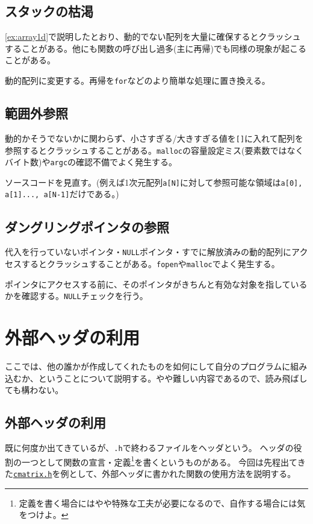 \subsection*{スタックの枯渇}
\ref{ex:array1d}で説明したとおり、動的でない配列を大量に確保するとクラッシュすることがある。他にも関数の呼び出し過多(主に再帰)でも同様の現象が起こることがある。

動的配列に変更する。再帰を\texttt{for}などのより簡単な処理に置き換える。

\subsection*{範囲外参照}
動的かそうでないかに関わらず、小さすぎる/大きすぎる値を\texttt{[]}に入れて配列を参照するとクラッシュすることがある。\texttt{malloc}の容量設定ミス(要素数ではなくバイト数)や\texttt{argc}の確認不備でよく発生する。

ソースコードを見直す。(例えば1次元配列\texttt{a[N]}に対して参照可能な領域は\texttt{a[0], a[1]..., a[N-1]}だけである。)

\subsection*{ダングリングポインタの参照}
代入を行っていないポインタ・\texttt{NULL}ポインタ・すでに解放済みの動的配列にアクセスするとクラッシュすることがある。\texttt{fopen}や\texttt{malloc}でよく発生する。

ポインタにアクセスする前に、そのポインタがきちんと有効な対象を指しているかを確認する。\texttt{NULL}チェックを行う。

\section{外部ヘッダの利用}
ここでは、他の誰かが作成してくれたものを如何にして自分のプログラムに組み込むか、ということについて説明する。やや難しい内容であるので、読み飛ばしても構わない。

\subsection{外部ヘッダの利用}
既に何度か出てきているが、\texttt{.h}で終わるファイルをヘッダという。
ヘッダの役割の一つとして関数の宣言・定義\footnote{定義を書く場合にはやや特殊な工夫が必要になるので、自作する場合には気をつけよ。}を書くというものがある。
今回は先程出てきた\hyperlink{cmatrix}{\texttt{cmatrix.h}}を例として、外部ヘッダに書かれた関数の使用方法を説明する。

